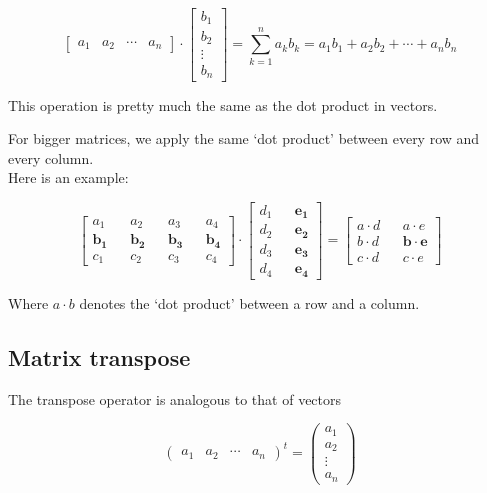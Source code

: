 \documentclass{article}
\begin{document}
\[
    \begin{bmatrix} 
        a_1 & a_2 & \cdots & a_n
    \end{bmatrix}
    \cdot
    \begin{bmatrix} 
        b_1 \\
        b_2 \\
        \vdots \\
        b_n
    \end{bmatrix}
    = \sum_{k=1}^{n} a_k b_k = a_1 b_1 + a_2 b_2 + \cdots + a_n b_n
\]

This operation is pretty much the same as the dot product in vectors.

For bigger matrices, we apply the same `dot product' between every row and every column. \\
Here is an example:

\[
    \begin{bmatrix} 
        a_1 && a_2 && a_3 && a_4 \\
        \mathbf{b_1} && \mathbf{b_2} && \mathbf{b_3} && \mathbf{b_4} \\
        c_1 && c_2 && c_3 && c_4
    \end{bmatrix}
    \cdot
    \begin{bmatrix} 
        d_1 && \mathbf{e_1} \\
        d_2 && \mathbf{e_2} \\
        d_3 && \mathbf{e_3} \\
        d_4 && \mathbf{e_4}
    \end{bmatrix}
    =
    \begin{bmatrix} 
        a \cdot d && a \cdot e \\
        b \cdot d && \mathbf{b \cdot e} \\
        c \cdot d && c \cdot e
    \end{bmatrix}
\]

Where \(a \cdot b\) denotes the `dot product' between a row and a column.

\pagebreak

\subsection{Matrix transpose}

The transpose operator is analogous to that of vectors

\[
    \begin{pmatrix}
        a_1 & a_2 & \cdots & a_n
    \end{pmatrix}^t
    =
    \begin{pmatrix}
        a_1 \\
        a_2 \\
        \vdots \\
        a_n
    \end{pmatrix}
\]
\end{document}
